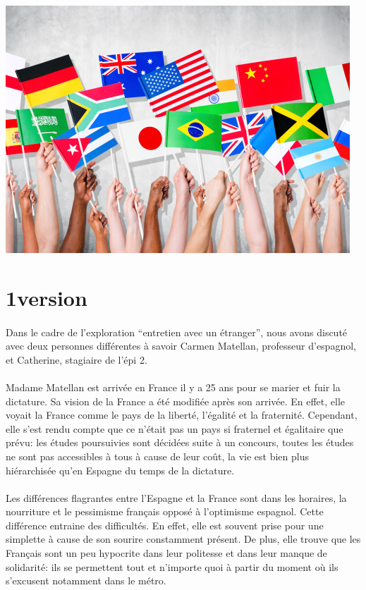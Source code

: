\begin{center}
	\includegraphics[scale=0.5]{entretien.jpg}
\end{center}

\section{1\iere version}

\paragraph{} Dans le cadre de l'exploration ``entretien avec un étranger'',
nous avons discuté avec deux personnes différentes à savoir Carmen Matellan,
professeur d'espagnol, et Catherine, stagiaire de l'épi 2.

\paragraph{} Madame Matellan est arrivée en France il y a 25 ans pour se marier
et fuir la dictature. Sa vision de la France a été modifiée après son arrivée.
En effet, elle voyait la France comme le pays de la liberté, l'égalité et la
fraternité. Cependant, elle s'est rendu compte que ce n'était pas un pays si
fraternel et égalitaire que prévu: les études poursuivies sont décidées suite à
un concours, toutes les études ne sont pas accessibles à tous à cause de leur
coût, la vie est bien plus hiérarchisée qu'en Espagne du temps de la dictature.

\paragraph{} Les différences flagrantes entre l'Espagne et la France sont dans
les horaires, la nourriture et le pessimisme français opposé à l'optimisme
espagnol. Cette différence entraine des difficultés. En effet, elle est souvent
prise pour une simplette à cause de son sourire constamment présent. De plus,
elle trouve que les Français sont un peu hypocrite dans leur politesse et dans
leur manque de solidarité: ils se permettent tout et n'importe quoi à partir du
moment où ils s'excusent notamment dans le métro.

